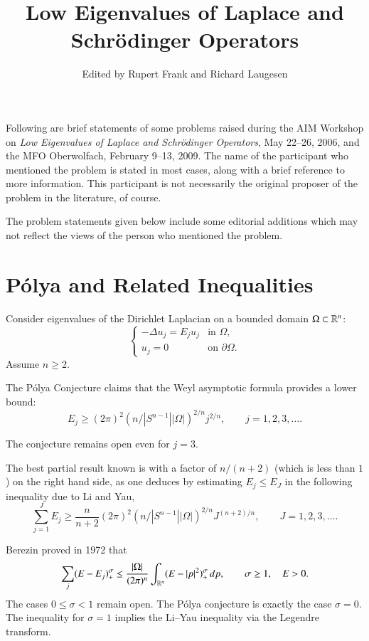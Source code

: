 \documentclass[12pt,letterpaper, reqno]{aimpl}
\begin{document}
\title{Low Eigenvalues of Laplace and Schr\"{o}dinger Operators}
\author{Edited by Rupert Frank and Richard Laugesen}


\maketitle

Following are brief statements of some problems raised during the
AIM Workshop on \emph{Low Eigenvalues of Laplace and Schr\"{o}dinger
Operators}, May 22--26, 2006, and the MFO Oberwolfach, February 9--13, 2009. The name of the participant who
mentioned the problem is stated in most cases, along with a brief
reference to more information. This participant is not necessarily
the original proposer of the problem in the literature, of course.

The problem statements given below include some editorial additions
which may not reflect the views of the person who
mentioned the problem.

\section{ P\'{o}lya and Related Inequalities}

Consider eigenvalues of the Dirichlet Laplacian on a bounded domain
$\Omega \subset \mathbb R^n$:
\[
\begin{cases}
-\Delta u_j = E_j u_j & \text{in $\Omega$,} \\
u_j = 0 & \text{on $\partial \Omega$.}
\end{cases}
\]
Assume $n \geq 2$.


\begin{problemblock}

\begin{problem}[1.1]
The P\'{o}lya Conjecture claims
that the Weyl asymptotic formula provides a lower bound:
\[
E_j \geq (2\pi)^2 (n/ |S^{n-1}| |\Omega|)^{2/n} j^{2/n} , \qquad j =
1,2,3,\ldots .
\]
\end{problem}

The conjecture remains open even for $j=3$.

\begin{remark}
The best partial result known is with a factor of $n/(n+2)$ (which
is less than $1$) on the right hand side, as one deduces by
estimating $E_j \leq E_J$ in the following inequality due to Li and Yau,
\[
\sum_{j=1}^J E_j \geq \frac{n}{n+2} (2\pi)^2 (n/ |S^{n-1}|
|\Omega|)^{2/n} J^{(n+2)/n} , \qquad J=1,2,3,\ldots .
\]
\end{remark}

\begin{remark}
Berezin proved in 1972 that
\[
\sum_j (E - E_j)_+^\sigma \leq \frac{|\Omega|}{(2\pi)^n} \int_{\mathbb R^n} (E
- |p|^2)_+^\sigma \, dp , \qquad \sigma \geq 1, \quad E>0.
\]
The cases $0 \leq \sigma < 1$ remain open. The P\'{o}lya conjecture is exactly the case $\sigma=0$.
The inequality for $\sigma=1$ implies the Li--Yau inequality via the Legendre transform.
\end{remark}

\end{problemblock}
\end{document}
